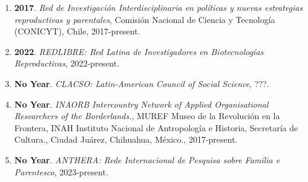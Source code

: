 \begin{enumerate}
\item {\bf 2017}. {\it Red de Investigación Interdisciplinaria en políticas y nuevas estrategias reproductivas y parentales}, Comisión Nacional de Ciencia y Tecnología (CONICYT), Chile, 2017-present.\filbreak
\item {\bf 2022}. {\it REDLIBRE: Red Latina de Investigadores en Biotecnologías Reproductivas}, 2022-present.\filbreak
\item {\bf No Year}. {\it CLACSO: Latin-American Council of Social Science}, ???.\filbreak
\item {\bf No Year}. {\it INAORB Intercountry Network of Applied Organisational Researchers of the Borderlands.}, MUREF Museo de la Revolución en la Frontera, INAH Instituto Nacional de Antropología e Historia, Secretaría de Cultura., Ciudad Juárez, Chihuahua, México., 2017-present.\filbreak
\item {\bf No Year}. {\it ANTHERA: Rede Internacional de Pesquisa sobre Família e Parentesco}, 2023-present.\filbreak
\end{enumerate} 
